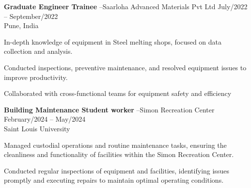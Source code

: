 \documentclass{article}
\newcommand{\employer}[4]{{
        \vspace*{2pt}%
        \textbf{#1} #2 \hfill #3\\ #4 \vspace*{2pt}}
        }
\renewcommand{\labelitemii}{
        $\vcenter{\hbox{\tiny$\bullet$}}$\hspace*{-3pt}
        }
\newenvironment{bullet-list-minor}{
          \begin{list}{\labelitemii}{\setlength\leftmargin{15pt} 
            \topsep 0pt \itemsep -2pt}}{\vspace*{4pt}\end{list}
            }
\begin{document}
      {
            \employer{Graduate Engineer Trainee}{--Saarloha Advanced Materials Pvt Ltd}{July/2022 -- September/2022}{Pune, India}
            \begin{bullet-list-minor}
                \item In-depth knowledge of equipment in Steel melting shops, focused on data collection and analysis.
\item Conducted inspections, preventive maintenance, and resolved equipment issues to improve productivity.
\item Collaborated with cross-functional teams for equipment safety and efficiency
            \end{bullet-list-minor}
          

            \employer{Building Maintenance Student worker}{--Simon Recreation Center }{February/2024 -- May/2024}{Saint Louis University }
            \begin{bullet-list-minor}
                \item Managed custodial operations and routine maintenance tasks, ensuring the cleanliness and functionality of facilities within the Simon Recreation Center.
\item Conducted regular inspections of equipment and facilities, identifying issues promptly and executing repairs to maintain optimal operating conditions.
            \end{bullet-list-minor}
          }
      \vspace*{4pt}%
\end{document}
